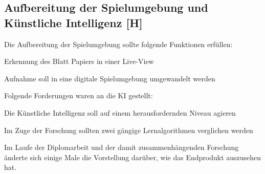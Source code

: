 \subsection{Aufbereitung der Spielumgebung und Künstliche Intelligenz [H]}
Die Aufbereitung der Spielumgebung sollte folgende Funktionen erfüllen:
\begin{compactitem}
    \item Erkennung des Blatt Papiers in einer Live-View
    \item Aufnahme soll in eine digitale Spielumgebung umgewandelt werden
\end{compactitem}

Folgende Forderungen waren an die KI gestellt:
\begin{compactitem}
    \item Die Künstliche Intelligenz soll auf einem herausfordernden Niveau agieren
    \item Im Zuge der Forschung sollten zwei gängige Lernalgorithmen verglichen werden
\end{compactitem}


Im Laufe der Diplomarbeit und der damit zusammenhängenden Forschung änderte sich einige Male die
Vorstellung darüber, wie das Endprodukt auszusehen hat.


